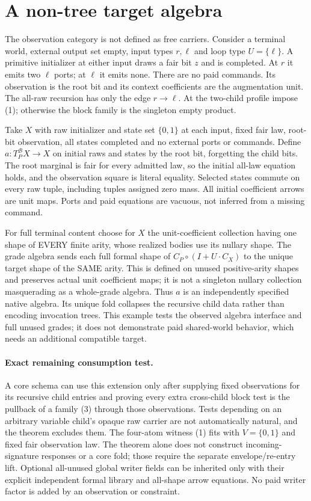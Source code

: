 \documentclass[11pt]{article}
\begin{document}
\section{A non-tree target algebra}
The observation category is not defined as free carriers. Consider a terminal world, external output set empty, input types $r,\ell$ and loop type $U=\{\ell\}$. A primitive initializer at either input draws a fair bit $z$ and is completed. At $r$ it emits two $\ell$ ports; at $\ell$ it emits none. There are no paid commands. Its observation is the root bit and its context coefficients are the augmentation unit. The all-raw recursion has only the edge $r\to\ell$. At the two-child profile impose (1); otherwise the block family is the singleton empty product.

Take $X$ with raw initializer and state set $\{0,1\}$ at each input, fixed fair law, root-bit observation, all states completed and no external ports or commands. Define $a:T_P^{\mathcal B}X\to X$ on initial raws and states by the root bit, forgetting the child bits. The root marginal is fair for every admitted law, so the initial all-law equation holds, and the observation square is literal equality. Selected states commute on every raw tuple, including tuples assigned zero mass. All initial coefficient arrows are unit maps. Ports and paid equations are vacuous, not inferred from a missing command.

For full terminal content choose for $X$ the unit-coefficient collection having one shape of EVERY finite arity, whose realized bodies use its nullary shape. The grade algebra sends each full formal shape of $C_P\circ(I+U\cdot C_X)$ to the unique target shape of the SAME arity. This is defined on unused positive-arity shapes and preserves actual unit coefficient maps; it is not a singleton nullary collection masquerading as a whole-grade algebra. Thus $a$ is an independently specified native algebra. Its unique fold collapses the recursive child data rather than encoding invocation trees. This example tests the observed algebra interface and full unused grades; it does not demonstrate paid shared-world behavior, which needs an additional compatible target.

\paragraph{Exact remaining consumption test.}
A core schema can use this extension only after supplying fixed observations for its recursive child entries and proving every extra cross-child block test is the pullback of a family (3) through those observations. Tests depending on an arbitrary variable child's opaque raw carrier are not automatically natural, and the theorem excludes them. The four-atom witness (1) fits with $V=\{0,1\}$ and fixed fair observation law. The theorem alone does not construct incoming-signature responses or a core fold; those require the separate envelope/re-entry lift. Optional all-unused global writer fields can be inherited only with their explicit independent formal library and all-shape arrow equations. No paid writer factor is added by an observation or constraint.
\end{document}
